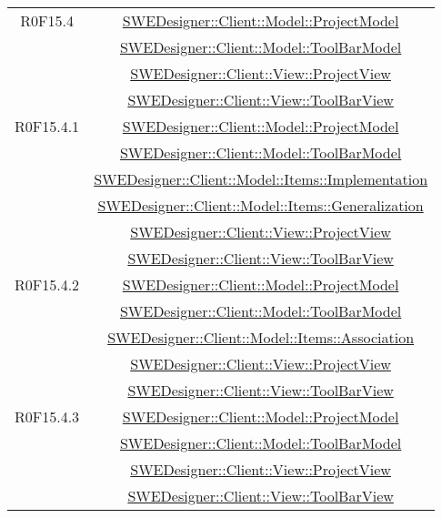 \documentclass[../DefinizioneDiProdotto.tex]{subfiles}
\begin{document}
\begin{longtable}{|c|c|}
				R0F15.4
				& \hyperlink{SWEDesigner::Client::Model::ProjectModel}{SWEDesigner::Client::Model::ProjectModel}\\
				& \hyperlink{SWEDesigner::Client::Model::ToolBarModel}{SWEDesigner::Client::Model::ToolBarModel}\\
				& \hyperlink{SWEDesigner::Client::View::ProjectView}{SWEDesigner::Client::View::ProjectView}\\
				& \hyperlink{SWEDesigner::Client::View::ToolBarView}{SWEDesigner::Client::View::ToolBarView}\\
				\hline

				R0F15.4.1
				& \hyperlink{SWEDesigner::Client::Model::ProjectModel}{SWEDesigner::Client::Model::ProjectModel}\\
				& \hyperlink{SWEDesigner::Client::Model::ToolBarModel}{SWEDesigner::Client::Model::ToolBarModel}\\
				& \hyperlink{SWEDesigner::Client::Model::Items::Implementation}{SWEDesigner::Client::Model::Items::Implementation}\\
				& \hyperlink{SWEDesigner::Client::Model::Items::Generalization}{SWEDesigner::Client::Model::Items::Generalization}\\
				& \hyperlink{SWEDesigner::Client::View::ProjectView}{SWEDesigner::Client::View::ProjectView}\\
				& \hyperlink{SWEDesigner::Client::View::ToolBarView}{SWEDesigner::Client::View::ToolBarView}\\
				\hline

				R0F15.4.2
				& \hyperlink{SWEDesigner::Client::Model::ProjectModel}{SWEDesigner::Client::Model::ProjectModel}\\
				& \hyperlink{SWEDesigner::Client::Model::ToolBarModel}{SWEDesigner::Client::Model::ToolBarModel}\\
				& \hyperlink{SWEDesigner::Client::Model::Items::Association}{SWEDesigner::Client::Model::Items::Association}\\
				& \hyperlink{SWEDesigner::Client::View::ProjectView}{SWEDesigner::Client::View::ProjectView}\\
				& \hyperlink{SWEDesigner::Client::View::ToolBarView}{SWEDesigner::Client::View::ToolBarView}\\
				\hline

				R0F15.4.3
				& \hyperlink{SWEDesigner::Client::Model::ProjectModel}{SWEDesigner::Client::Model::ProjectModel}\\
				& \hyperlink{SWEDesigner::Client::Model::ToolBarModel}{SWEDesigner::Client::Model::ToolBarModel}\\
				& \hyperlink{SWEDesigner::Client::View::ProjectView}{SWEDesigner::Client::View::ProjectView}\\
				& \hyperlink{SWEDesigner::Client::View::ToolBarView}{SWEDesigner::Client::View::ToolBarView}\\
				\hline


\end{longtable}
\end{document}
